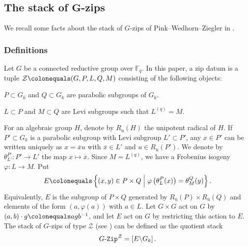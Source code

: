 \documentclass[10pt,a4paper]{article}
\numberwithin{equation}{section}
\theoremstyle{definition}
\theoremstyle{remark}
\newcommand{\GZip}{\mathop{\text{$G$-{\tt Zip}}}\nolimits}
\newcommand{\Zcal}{{\mathcal Z}}
\newcommand{\FF}{\mathbb{F}}
\newcommand{\relmiddle}[1]{\mathrel{}\middle#1\mathrel{}}
\begin{document}
\subsection{The stack of $\boldsymbol{G}$-zips}\label{sec-Gzips}

We recall some facts about the stack of $G$-zips of Pink--Wedhorn--Ziegler in \cite{Pink-Wedhorn-Ziegler-zip-data}.

\subsubsection{Definitions} \label{subsec-zipdatum}
Let $G$ be a connected reductive group over $\FF_q$. In this paper, a zip datum is a tuple $\Zcal \colonequals (G,P,L,Q,M)$ consisting of the following objects:
\begin{equivlist}
    \item $P\subset G_k$ and $Q\subset G_k$ are parabolic subgroups of $G_k$.
    \item $L\subset P$ and $M\subset Q$ are Levi subgroups such that $L^{(q)}=M$. 
\end{equivlist}
For an algebraic group $H$, denote by $R_{\mathrm{u}}(H)$ the unipotent radical of $H$. If $P'\subset G_k$ is a parabolic subgroup with Levi subgroup $L'\subset P'$, any $x\in P'$ can be written uniquely as $x=\overline{x}u$ with $\overline{x}\in L'$ and $u\in R_{\mathrm{u}}(P')$. We denote by $\theta^{P'}_{L'} \colon P'\to L'$ the map $x\mapsto \overline{x}$. Since $M=L^{(q)}$, we have a Frobenius isogeny $\varphi \colon L\to M$. Put
\begin{equation}\label{zipgroup}
E \colonequals \left\{(x,y)\in P\times Q \relmiddle|  \varphi\left(\theta^P_L(x)\right)=\theta^Q_M(y)\right\}.
\end{equation}
Equivalently, $E$ is the subgroup of $P\times Q$ generated by $R_{\mathrm{u}}(P)\times R_{\mathrm{u}}(Q)$ and elements of the form $(a,\varphi(a))$ with $a\in L$. Let $G\times G$ act on $G$ by $(a,b)\cdot g \colonequals agb^{-1}$, and let $E$ act on $G$ by restricting this action to $E$. The stack of $G$-zips of type $\Zcal$ (see \cite{Pink-Wedhorn-Ziegler-zip-data,Pink-Wedhorn-Ziegler-F-Zips-additional-structure}) can be defined as the quotient stack
\[
\GZip^\Zcal = \left[E\backslash G_k \right].
\]
\end{document}
